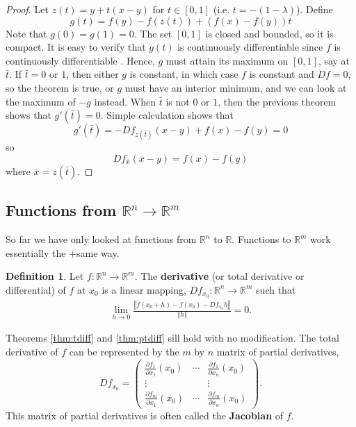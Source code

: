 \documentclass[12pt,reqno]{amsart}
\theoremstyle{definition}
\newtheorem{definition}{Definition}[section]
\def\R{\mathbb{R}}
\newcommand{\norm}[1]{\left\Vert {#1} \right\Vert}
\renewcommand{\to}{{\rightarrow}}
\begin{document}
\begin{proof}
  Let $z(t) = y + t(x-y)$ for $t \in [0,1]$ (i.e.
  $t=-(1-\lambda)$). Define
  \[ g(t) = f(y) - f(z(t)) + \left(f(x) - f(y)\right) t \] Note that
  $g(0) = g(1) = 0$. The set $[0,1]$ is closed and bounded, so it is
  compact. It is easy to verify that $g(t)$ is continuously
  differentiable since $f$ is continuously differentiable . Hence, $g$
  must attain its maximum on $[0,1]$, say at $\bar{t}$. If $\bar{t} =
  0$ or $1$, then either $g$ is constant, in which case $f$ is
  constant and $Df = 0$, so the theorem is true, or $g$ must have an
  interior minimum, and we can look at the maximum of $-g$
  instead. When $\bar{t}$ is not $0$ or $1$, then the previous theorem
  shows that $g'(\bar{t}) = 0$. Simple calculation shows that
  \[ g'(\bar{t}) = -Df_{z(\bar{t})} (x-y) +  f(x) - f(y) = 0 \]
  so 
  \[ Df_{\bar{x}}(x-y) = f(x) - f(y) \]
  where $\bar{x} = z(\bar{t})$.
\end{proof}

\subsection{Functions from $\R^n \to \R^m$}

So far we have only looked at functions from $\R^n$ to $\R$. Functions
to $\R^m$ work essentially the +same way. 
\begin{definition}
  Let $f: \R^n \to \R^m$. The \textbf{derivative} (or total derivative
  or differential) of $f$ at $x_0$ is a linear mapping, $Df_{x_0}:
  \R^n \to \R^m$ such that
  \begin{align*}
    \lim_{h \to 0} \frac{\left\Vert f(x_0 + h) - f(x_0) - Df_{x_0}
        h\right\Vert} {\norm{h}} = 0. 
  \end{align*}
\end{definition}
Theorems \ref{thm:tdiff} and \ref{thm:ptdiff} sill hold with no
modification. The total derivative of $f$ can be represented by the
$m$ by $n$ matrix of partial derivatives,
\[ Df_{x_0}  = \begin{pmatrix} \frac{\partial f_1}{\partial x_1}(x_0) &
  \cdots & \frac{\partial f_1}{\partial x_n}(x_0) \\
  \vdots & & \vdots \\
  \frac{\partial f_m}{\partial x_1}(x_0) & \cdots & \frac{\partial
    f_m}{\partial x_n}(x_0)  
\end{pmatrix}. \] 
This matrix of partial derivatives is often called
the \textbf{Jacobian} of $f$. 
\end{document}
